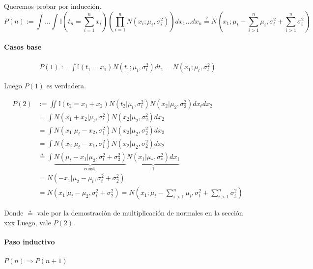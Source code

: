 \documentclass[11pt,twoside, spanish]{report} %
\begin{document}
Queremos probar por inducci\'on.
\begin{equation}
	P(n):= \int \dots \int \mathbb{I}(t_n= \sum_{i=1}^n x_i ) \left( \prod_{i=1}^n N(x_i;\mu_i,\sigma_i^2) \right) dx_1 \dots dx_n \overset{?}{=} N\left(x_1;\mu_t-\sum_{i>1}^n \mu_i,\sigma_t^2+\sum_{i>1}^n\sigma_i^2\right)
\end{equation}

\paragraph{Casos base}

\begin{equation}
	\begin{split}
		P(1) := \int \mathbb{I}(t_1 = x_1) N(t_1;\mu_t,\sigma_t^2) dt_1 = N(x_1;\mu_t,\sigma_t^2)
	\end{split}
\end{equation}

Luego $P(1)$ es verdadera.

\begin{equation}
	\begin{split}
		P(2) & := \iint \mathbb{I}(t_2 = x_1 + x_2) N(t_2|\mu_t, \sigma_t^2)N(x_2|\mu_2, \sigma_2^2) dx_tdx_2 \\
		&= \int N( x_1 + x_2|\mu_t, \sigma_t^2) N(x_2|\mu_2, \sigma_2^2) dx_2   \\
		& = \int N(x_1|\mu_t-x_2, \sigma_1^2) N(x_2| \mu_2, \sigma_2^2) dx_2 \\
		& = \int N(x_2|\mu_t-x_1, \sigma_1^2) N(x_2| \mu_2, \sigma_2^2) dx_2 \\
		& \overset{*}{=} \int \underbrace{N(\mu_t-x_1|\mu_2,\sigma_t^2 + \sigma_2^2)}_{\text{const.}} \underbrace{N(x_1|\mu_{*},\sigma_{*}^2) dx_1}_{1} \\
		& = N(-x_1|\mu_2-\mu_t,\sigma_t^2 + \sigma_2^2)\\
		& = N(x_1|\mu_t-\mu_2,\sigma_t^2 + \sigma_2^2) = N(x_1;\mu_t-\sum_{i>1}^n \mu_i,\sigma_t^2+\sum_{i>1}^n \sigma_i^2 )
	\end{split}
\end{equation}

Donde $\overset{*}{=}$ vale por la demostraci\'on de multiplicaci\'on de normales en la secci\'on xxx%
Luego, vale $P(2)$.


\paragraph{Paso inductivo} $P(n) \Rightarrow P(n+1)$
\end{document}
